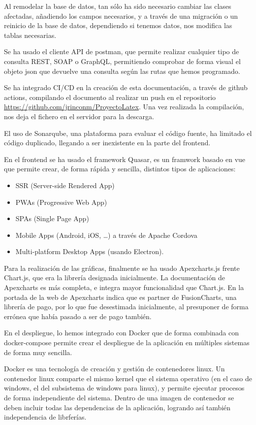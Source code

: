 \documentclass[11pt,spanish,listoffigures,listoftables]{tfgetsinf}
\begin{document}
Al remodelar la base de datos, tan sólo ha sido necesario cambiar las clases afectadas, añadiendo los campos necesarios, y a través de una migración o un reinicio de la base de datos, dependiendo si tenemos datos, nos modifica las tablas necesarias.

Se ha usado el cliente API de postman, que permite realizar cualquier tipo de consulta REST, SOAP o GraphQL, permitiendo comprobar de forma visual el objeto json que devuelve una consulta según las rutas que hemos programado.

Se ha integrado CI/CD en la creación de esta documentación, a través de github actions, compilando el documento al realizar un push en el repositorio \url{https://github.com/jrinconm/ProyectoLatex}. Una vez realizada la compilación, nos deja el fichero en el servidor para la descarga.

El uso de Sonarqube, una plataforma para evaluar el código fuente, ha limitado el código duplicado, llegando a ser inexistente en la parte del frontend.

En el frontend se ha usado el framework Quasar, es un framwork basado en vue que permite crear, de forma rápida y sencilla, distintos tipos de aplicaciones:

\begin{itemize}
  \item SSR (Server-side Rendered App)
  \item PWAs (Progressive Web App)
  \item SPAs (Single Page App)
  \item Mobile Apps (Android, iOS, …) a través de Apache Cordova
  \item Multi-platform Desktop Apps (usando Electron).
\end{itemize}

Para la realización de las gráficas, finalmente se ha usado Apexcharts.js frente Chart.js, que era la librería designada inicialmente. La documentación de Apexcharts es más completa, e integra mayor funcionalidad que Chart.js. 
En la portada de la web de Apexcharts indica que es partner de FusionCharts, una librería de pago, por lo que fue desestimada inicialmente, al presuponer de forma errónea que había pasado a ser de pago también.

En el despliegue, lo hemos integrado con Docker que de forma combinada con docker-compose permite crear el despliegue de la aplicación en múltiples sistemas de forma muy sencilla.

Docker es una tecnología de creación y gestión de contenedores linux. 
Un contenedor linux comparte el mismo kernel que el sistema operativo (en el caso de windows, el del subsistema de windows para linux), y permite ejecutar procesos de forma independiente del sistema. 
Dentro de una imagen de contenedor se deben incluir todas las dependencias de la aplicación, logrando así también independencia de librferías.
\end{document}
